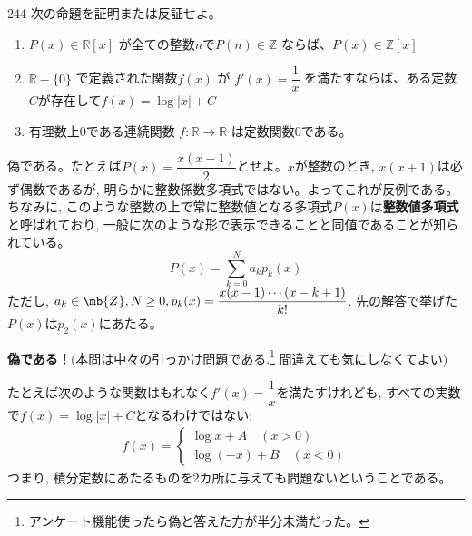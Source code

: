 \begin{prob}{244}{}{}
 次の命題を証明または反証せよ。
 \begin{enumerate}
  \item $P(x)\in\mathbb{R}[x]$ が全ての整数$n$で$P(n)\in\mathbb{Z}$ ならば、$P(x)\in\mathbb{Z}[x]$
  \item $\mathbb{R}-\{0\}$ で定義された関数$f(x)$ が $f'(x)=\dfrac{1}{x}$ を満たすならば、ある定数$C$が存在して$f(x)=\log |x|+C$
  \item 有理数上0である連続関数 $f:\mathbb{R}\rightarrow\mathbb{R}$ は定数関数0である。
 \end{enumerate}
\end{prob}

偽である。たとえば$P(x) = \dfrac{x(x-1)}{2}$とせよ。$x$が整数のとき, $x(x+1)$は必ず偶数であるが, 明らかに整数係数多項式ではない。よってこれが反例である。ちなみに, このような整数の上で常に整数値となる多項式$P(x)$は\textbf{整数値多項式}と呼ばれており, 一般に次のような形で表示できることと同値であることが知られている。
\[ P(x) = \sum_{k=0}^{N} a_kp_{k}(x) \]
ただし, $a_k\in\mb{Z}, N\geq 0,  p_{k}(x) = \dfrac{x(x-1)\cdots (x-k+1)}{k!}$.  先の解答で挙げた$P(x)$は$p_2(x)$にあたる。

 \textbf{偽である！}(本問は中々の引っかけ問題である.\footnote{アンケート機能使ったら偽と答えた方が半分未満だった。} 間違えても気にしなくてよい)

たとえば次のような関数はもれなく$f'(x)=\dfrac{1}{x}$を満たすけれども, すべての実数で$f(x) = \log{|x|}+C$となるわけではない:
\begin{align*}
 f(x)=\left\{
 \begin{aligned}
  \log{x}+A \quad(x>0) \\
  \log{(-x)}+B \quad (x<0)
 \end{aligned}
 \right.
\end{align*}
つまり, 積分定数にあたるものを2カ所に与えても問題ないということである。

